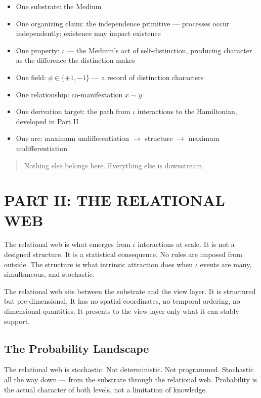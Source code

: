 \documentclass[11pt,letterpaper]{article}
\begin{document}
\begin{itemize}
\item One substrate: the Medium
\item One organizing claim: the independence primitive --- processes occur independently; existence may impact existence
\item One property: \(\iota\) --- the Medium's act of self-distinction, producing character as the difference the distinction makes
\item One field: \(\phi \in \{+1, -1\}\) --- a record of distinction characters
\item One relationship: co-manifestation \(x \sim y\)
\item One derivation target: the path from \(\iota\) interactions to the Hamiltonian, developed in Part II
\item One arc: maximum undifferentiation \(\to\) structure \(\to\) maximum undifferentiation
\end{itemize}

\begin{quote}
Nothing else belongs here. Everything else is downstream.
\end{quote}


\section{PART II: THE RELATIONAL WEB}
\label{sec:orgca06c28}

The relational web is what emerges from \(\iota\) interactions at scale. It is not a designed structure. It is a statistical consequence. No rules are imposed from outside. The structure is what intrinsic attraction does when \(\iota\) events are many, simultaneous, and stochastic.

The relational web sits between the substrate and the view layer. It is structured but pre-dimensional. It has no spatial coordinates, no temporal ordering, no dimensional quantities. It presents to the view layer only what it can stably support.

\subsection{The Probability Landscape}
\label{sec:orgce9bfa3}

The relational web is stochastic. Not deterministic. Not programmed. Stochastic all the way down --- from the substrate through the relational web. Probability is the actual character of both levels, not a limitation of knowledge.
\end{document}
